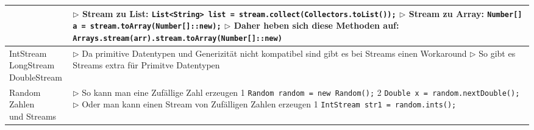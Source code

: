 \begin{table}[H]
\begin{tabular}{ | p{4cm} p{13.5cm} | }
	\makecell[l]{Stream zu...} & 
	\makecell[l]
	{
	$\rhd$ Stream zu List: \\
	\hspace{0.5cm} \texttt{List<String> list = stream.collect(Collectors.toList());} \\
	$\rhd$ Stream zu Array: \\
	\hspace{0.5cm} \texttt{Number[] a = stream.toArray(Number[]::new);} \\
	$\rhd$ Daher heben sich diese Methoden auf: \\
	\hspace{0.5cm} \texttt{Arrays.stream(arr).stream.toArray(Number[]::new)} \\
	} 	\\ \hline


	\makecell[l]{IntStream \\ LongStream \\ DoubleStream} & 
	\makecell[l]
	{
	$\rhd$ Da primitive Datentypen und Generizität nicht kompatibel sind \\
	\hspace{0.35cm} gibt es bei Streams einen Workaround \\
	$\rhd$ So gibt es Streams extra für Primitve Datentypen \\
	} 	\\ \hline


	\makecell[l]{Random Zahlen \\ und Streams} & 
	\makecell[l]
	{
	$\rhd$ So kann man eine Zufällige Zahl erzeugen \\
	\hspace{0.5cm} 1 \hspace{0.4cm} \texttt{Random random = new Random();} \\
	\hspace{0.5cm} 2 \hspace{0.4cm} \texttt{Double x = random.nextDouble();} \\
	$\rhd$ Oder man kann einen Stream von Zufälligen Zahlen erzeugen \\
	\hspace{0.5cm} 1 \hspace{0.4cm} \texttt{IntStream str1 = random.ints();} \\
	} 	\\ \hline



\end{tabular}
\end{table}
